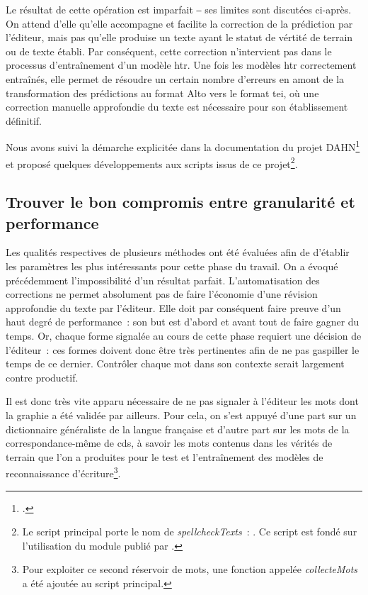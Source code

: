 \documentclass[a4paper,12pt,twoside]{book}
\begin{document}
			Le résultat de cette opération est imparfait ‒ ses limites sont discutées ci-après. On attend d'elle qu'elle accompagne et facilite la correction de la prédiction par l'éditeur, mais pas qu'elle produise un texte ayant le statut de vértité de terrain ou de texte établi. Par conséquent, cette correction n'intervient pas dans le processus d'entraînement d'un modèle \gls{htr}. Une fois les modèles \gls{htr} correctement entraînés, elle permet de résoudre un certain nombre d'erreurs en amont de la transformation des prédictions au format Alto vers le format \gls{tei}, où une correction manuelle approfondie du texte est nécessaire pour son établissement définitif.
			
			Nous avons suivi la démarche explicitée dans la documentation du projet DAHN\footcite{chiffoleauHowPostOCRCorrection2022} et proposé quelques développements aux scripts issus de ce projet\footnote{Le script principal porte le nom de \textit{spellcheckTexts}~: \cite{biaySpellcheckTextsPy2022}. Ce script est fondé sur l'utilisation du module publié par \cite{barrusPyspellcheckerPurePython}.}.
					
			\subsection{Trouver le bon compromis entre granularité et performance}
				Les qualités respectives de plusieurs méthodes ont été évaluées afin de d'établir les paramètres les plus intéressants pour cette phase du travail. On a évoqué précédemment l'impossibilité d'un résultat parfait. L'automatisation des corrections ne permet absolument pas de faire l'économie d'une révision approfondie du texte par l'éditeur. Elle doit par conséquent faire preuve d'un haut degré de performance~: son but est d'abord et avant tout de faire gagner du temps. Or, chaque forme signalée au cours de cette phase requiert une décision de l'éditeur~: ces formes doivent donc être très pertinentes afin de ne pas gaspiller le temps de ce dernier. Contrôler chaque mot dans son contexte serait largement contre productif.
				
				Il est donc très vite apparu nécessaire de ne pas signaler à l'éditeur les mots dont la graphie a été validée par ailleurs. Pour cela, on s'est appuyé d'une part sur un dictionnaire généraliste de la langue française et d'autre part sur les mots de la correspondance-même de \gls{cds}, à savoir les mots contenus dans les vérités de terrain que l'on a produites pour le test et l'entraînement des modèles de reconnaissance d'écriture\footnote{Pour exploiter ce second réservoir de mots, une fonction appelée \textit{collecteMots} a été ajoutée au script principal.}.
			
\end{document}

